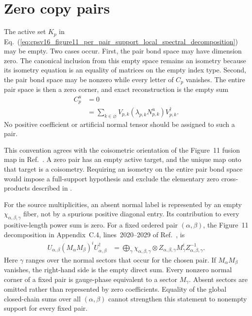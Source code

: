 \documentclass{article}
\begin{document}
\section{Zero copy pairs}

The active set $K_p$ in
Eq.~(\ref{eq:cpsv16_figure11_per_pair_support_local_spectral_decomposition})
may be empty. Two cases occur. First, the pair bond space may have dimension
zero. The canonical inclusion from this empty space remains an isometry
because its isometry equation is an equality of matrices on the empty index
type. Second, the pair bond space may be nonzero while every letter of $C_p$
vanishes. The entire pair space is then a zero corner, and exact
reconstruction is the empty sum
\begin{align}
    C_p^u
        &= 0
    \label{eq:cpsv16_figure11_per_pair_support_zero_pair_block}\\
        &= \sum_{k\in\varnothing}
            V_{p,k}(\lambda_{p,k}N_{p,k}^u)V_{p,k}^\dagger.
    \label{eq:cpsv16_figure11_per_pair_support_empty_pair_reconstruction}
\end{align}
No positive coefficient or artificial normal tensor should be assigned to
such a pair.

This convention agrees with the coisometric orientation of the Figure~11
fusion map in Ref.~\cite{Cirac2016MPDO_arXiv}. A zero pair has an empty active
target, and the unique map onto that target is a coisometry. Requiring an
isometry on the entire pair bond space would impose a full-support hypothesis
and exclude the elementary zero cross-products described in
.

For the source multiplicities, an absent normal label is represented by an
empty $\chi_{\alpha,\beta,\gamma}$ fiber, not by a spurious positive diagonal
entry. Its contribution to every positive-length power sum is zero. For a
fixed ordered pair $(\alpha,\beta)$, the Figure~11 decomposition in
Appendix~C.4, lines~2020--2029 of Ref.~\cite{Cirac2016MPDO_arXiv}, is
\begin{align}
    U_{\alpha,\beta}(M_\alpha M_\beta)^iU_{\alpha,\beta}^\dagger
        &= \bigoplus_\gamma
            \chi_{\alpha,\beta,\gamma}\otimes
            Z_{\alpha,\beta,\gamma}M_\gamma^i
            Z_{\alpha,\beta,\gamma}^{-1}.
    \label{eq:cpsv16_figure11_per_pair_support_figure11_pair_decomposition}
\end{align}
Here $\gamma$ ranges over the normal sectors that occur for the chosen pair.
If $M_\alpha M_\beta$ vanishes, the right-hand side is the empty direct sum.
Every nonzero normal corner of a fixed pair is gauge-phase equivalent to a
sector $M_\gamma$. Absent sectors are omitted rather than represented by zero
coefficients. Equality of the global closed-chain sums over all
$(\alpha,\beta)$ cannot strengthen this statement to nonempty support for
every fixed pair.
\end{document}
